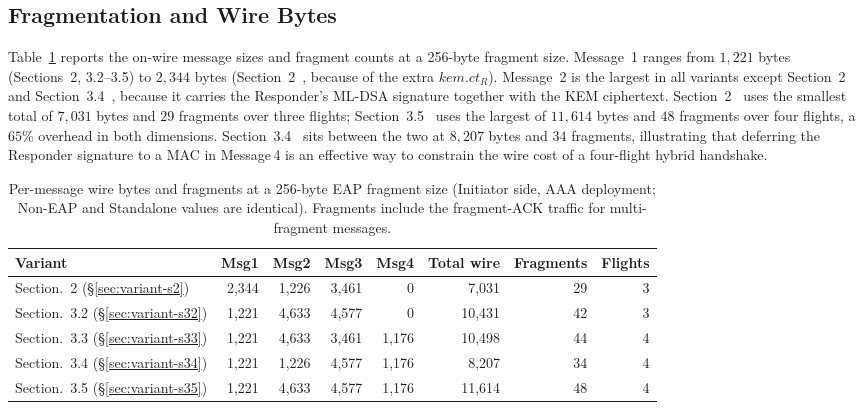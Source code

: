 \documentclass{easychair}
\newcommand{\VarSec}[1]{Section~#1~\cite{pq-edhoc-draft}}
\newcommand{\VarSecShort}[1]{Section.~#1}
\begin{document}
\subsection{Fragmentation and Wire Bytes}
Table~\ref{tab:frag} reports the on-wire message sizes and fragment
counts at a 256-byte fragment size. Message~1 ranges from $1{,}221$
bytes (Sections~2, 3.2--3.5) to $2{,}344$ bytes (\VarSec{2}, because of
the extra $\mathit{kem.ct}_R$). Message~2 is the largest in all
variants except \VarSec{2} and \VarSec{3.4}, because it carries the
Responder's ML-DSA signature together with the KEM ciphertext.
\VarSec{2} uses the smallest total of $7{,}031$ bytes and $29$
fragments over three flights; \VarSec{3.5} uses the largest of
$11{,}614$ bytes and $48$ fragments over four flights, a $65\%$
overhead in both dimensions. \VarSec{3.4} sits between the two at
$8{,}207$ bytes and $34$ fragments, illustrating that deferring the
Responder signature to a MAC in Message\,4 is an effective way to
constrain the wire cost of a four-flight hybrid handshake.

\begin{table}[h]
\centering
\footnotesize
\caption{Per-message wire bytes and fragments at a 256-byte EAP
fragment size (Initiator side, AAA deployment; Non-EAP and Standalone
values are identical). Fragments include the fragment-ACK traffic for
multi-fragment messages.}
\label{tab:frag}
\begin{tabular}{lrrrrrrr}
\toprule
\textbf{Variant} & \textbf{Msg1} & \textbf{Msg2} & \textbf{Msg3} & \textbf{Msg4} & \textbf{Total wire} & \textbf{Fragments} & \textbf{Flights} \\
\midrule
\VarSecShort{2}   (\S\ref{sec:variant-s2})  & 2{,}344 & 1{,}226 & 3{,}461 & 0       &  7{,}031 & 29 & 3 \\
\VarSecShort{3.2} (\S\ref{sec:variant-s32}) & 1{,}221 & 4{,}633 & 4{,}577 & 0       & 10{,}431 & 42 & 3 \\
\VarSecShort{3.3} (\S\ref{sec:variant-s33}) & 1{,}221 & 4{,}633 & 3{,}461 & 1{,}176 & 10{,}498 & 44 & 4 \\
\VarSecShort{3.4} (\S\ref{sec:variant-s34}) & 1{,}221 & 1{,}226 & 4{,}577 & 1{,}176 &  8{,}207 & 34 & 4 \\
\VarSecShort{3.5} (\S\ref{sec:variant-s35}) & 1{,}221 & 4{,}633 & 4{,}577 & 1{,}176 & 11{,}614 & 48 & 4 \\
\bottomrule
\end{tabular}
\end{table}
\end{document}
